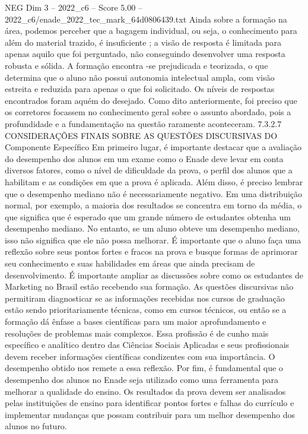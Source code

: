 \begin{textsample}{NEG Dim 3 – 2022\_c6 – Score 5.00 – 2022\_c6/enade\_2022\_tec\_mark\_64d0806439.txt}
Ainda sobre a formação na área, podemos perceber que a bagagem individual, ou seja, o conhecimento para além do material trazido, é insuficiente ; a visão de resposta é limitada para apenas aquilo que foi perguntado, não conseguindo desenvolver uma resposta robusta e sólida.
A formação encontra -se prejudicada e teorizada, o que determina que o aluno não possui autonomia intelectual ampla, com visão estreita e reduzida para apenas o que foi solicitado.
Os níveis de respostas encontrados foram aquém do desejado.
Como dito anteriormente, foi preciso que os corretores focassem no conhecimento geral sobre o assunto abordado, pois a profundidade e a fundamentação na questão raramente aconteceram. 7.3.2.7 CONSIDERAÇÕES FINAIS SOBRE AS QUESTÕES DISCURSIVAS DO Componente Específico Em primeiro lugar, é importante destacar que a avaliação do desempenho dos alunos em um exame como o Enade deve levar em conta diversos fatores, como o nível de dificuldade da prova, o perfil dos alunos que a habilitam e as condições em que a prova é aplicada.
Além disso, é preciso lembrar que o desempenho mediano não é necessariamente negativo.
Em uma distribuição normal, por exemplo, a maioria dos resultados se concentra em torno da média, o que significa que é esperado que um grande número de estudantes obtenha um desempenho mediano.
No entanto, se um aluno obteve um desempenho mediano, isso não significa que ele não possa melhorar.
É importante que o aluno faça uma reflexão sobre seus pontos fortes e fracos na prova e busque formas de aprimorar seu conhecimento e suas habilidades em áreas que ainda precisam de desenvolvimento.
É importante ampliar as discussões sobre como os estudantes de Marketing no Brasil estão recebendo sua formação.
As questões discursivas não permitiram diagnosticar se as informações recebidas nos cursos de graduação estão sendo prioritariamente técnicas, como em cursos técnicos, ou então se a formação dá ênfase a bases científicas para um maior aprofundamento e resoluções de problemas mais complexos.
Essa profissão é de cunho mais específico e analítico dentro das Ciências Sociais Aplicadas e seus profissionais devem receber informações científicas condizentes com sua importância.
O desempenho obtido nos remete a essa reflexão.
Por fim, é fundamental que o desempenho dos alunos no Enade seja utilizado como uma ferramenta para melhorar a qualidade do ensino.
Os resultados da prova devem ser analisados pelas instituições de ensino para identificar pontos fortes e falhas do currículo e implementar mudanças que possam contribuir para um melhor desempenho dos alunos no futuro.

\end{textsample}
